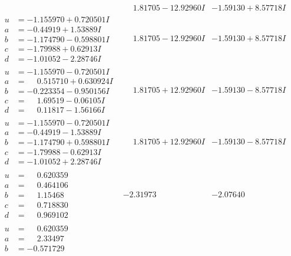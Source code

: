 \documentclass[1p]{elsarticle_modified}
\theoremstyle{definition}
\begin{document}
$$\begin{array}{c|c|c}
 & \phantom{-}1.81705 - 12.92960 I & -1.59130 + 8.57718 I \\ \hline\begin{aligned}
u &= -1.155970 + 0.720501 I \\
a &= -0.44919 + 1.53889 I \\
b &= -1.174790 - 0.598801 I \\
c &= -1.79988 + 0.62913 I \\
d &= -1.01052 - 2.28746 I\end{aligned}
 & \phantom{-}1.81705 - 12.92960 I & -1.59130 + 8.57718 I \\ \hline\begin{aligned}
u &= -1.155970 - 0.720501 I \\
a &= \phantom{-}0.515710 + 0.630924 I \\
b &= -0.223354 - 0.950156 I \\
c &= \phantom{-}1.69519 - 0.06105 I \\
d &= \phantom{-}0.11817 - 1.56166 I\end{aligned}
 & \phantom{-}1.81705 + 12.92960 I & -1.59130 - 8.57718 I \\ \hline\begin{aligned}
u &= -1.155970 - 0.720501 I \\
a &= -0.44919 - 1.53889 I \\
b &= -1.174790 + 0.598801 I \\
c &= -1.79988 - 0.62913 I \\
d &= -1.01052 + 2.28746 I\end{aligned}
 & \phantom{-}1.81705 + 12.92960 I & -1.59130 - 8.57718 I \\ \hline\begin{aligned}
u &= \phantom{-}0.620359\phantom{ +0.000000I} \\
a &= \phantom{-}0.464106\phantom{ +0.000000I} \\
b &= \phantom{-}1.15468\phantom{ +0.000000I} \\
c &= \phantom{-}0.718830\phantom{ +0.000000I} \\
d &= \phantom{-}0.969102\phantom{ +0.000000I}\end{aligned}
 & -2.31973\phantom{ +0.000000I} & -2.07640\phantom{ +0.000000I} \\ \hline\begin{aligned}
u &= \phantom{-}0.620359\phantom{ +0.000000I} \\
a &= \phantom{-}2.33497\phantom{ +0.000000I} \\
b &= -0.571729\phantom{ +0.000000I} \\

\end{aligned}
\end{array}$$
\end{document}

